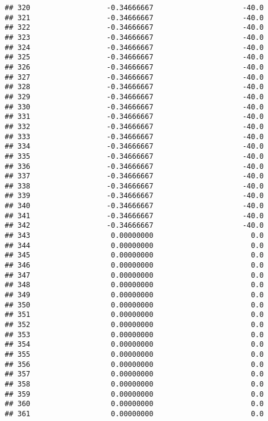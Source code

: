 \documentclass[]{article}
\begin{document}
\begin{verbatim}
## 320                  -0.34666667                     -40.0
## 321                  -0.34666667                     -40.0
## 322                  -0.34666667                     -40.0
## 323                  -0.34666667                     -40.0
## 324                  -0.34666667                     -40.0
## 325                  -0.34666667                     -40.0
## 326                  -0.34666667                     -40.0
## 327                  -0.34666667                     -40.0
## 328                  -0.34666667                     -40.0
## 329                  -0.34666667                     -40.0
## 330                  -0.34666667                     -40.0
## 331                  -0.34666667                     -40.0
## 332                  -0.34666667                     -40.0
## 333                  -0.34666667                     -40.0
## 334                  -0.34666667                     -40.0
## 335                  -0.34666667                     -40.0
## 336                  -0.34666667                     -40.0
## 337                  -0.34666667                     -40.0
## 338                  -0.34666667                     -40.0
## 339                  -0.34666667                     -40.0
## 340                  -0.34666667                     -40.0
## 341                  -0.34666667                     -40.0
## 342                  -0.34666667                     -40.0
## 343                   0.00000000                       0.0
## 344                   0.00000000                       0.0
## 345                   0.00000000                       0.0
## 346                   0.00000000                       0.0
## 347                   0.00000000                       0.0
## 348                   0.00000000                       0.0
## 349                   0.00000000                       0.0
## 350                   0.00000000                       0.0
## 351                   0.00000000                       0.0
## 352                   0.00000000                       0.0
## 353                   0.00000000                       0.0
## 354                   0.00000000                       0.0
## 355                   0.00000000                       0.0
## 356                   0.00000000                       0.0
## 357                   0.00000000                       0.0
## 358                   0.00000000                       0.0
## 359                   0.00000000                       0.0
## 360                   0.00000000                       0.0
## 361                   0.00000000                       0.0

\end{verbatim}
\end{document}
